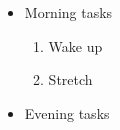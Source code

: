 \documentclass{article}
\begin{document}
\begin{itemize}
\item Morning tasks
  \begin{enumerate}
  \item Wake up
  \item Stretch
  \end{enumerate}
\item Evening tasks
\end{itemize}
\end{document}
